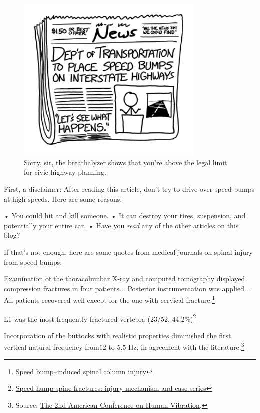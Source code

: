 {\begin{figure}[!htbp]
\centering
\includegraphics[scale=0.5, max width=0.8\textwidth]{imgs/a/61/speedbump_dot.png}
\caption{Sorry, sir, the breathalyzer shows that you're above the legal limit for civic highway planning.}
\end{figure}

{First, a disclaimer: After reading this article, don't try to drive over speed bumps at high speeds. Here are some reasons:}

{• You could hit and kill someone.
• It can destroy your tires, suspension, and potentially your entire car.
• Have you \emph{read} any of the other articles on this blog?
}

{If that's not enough, here are some quotes from medical journals on spinal injury from speed bumps:}

{Examination of the thoracolumbar X-ray and computed tomography displayed compression fractures in four patients... Posterior instrumentation was applied... All patients recovered well except for the one with cervical fracture.{\footnote{ \href{http://akademikpersonel.duzce.edu.tr/hayatikandis/sci/hayatikandis12.01.2012\_08.54.59sci.pdf}{Speed bump–induced spinal column injury}} } }

{L1 was the most frequently fractured vertebra (23/52, 44.2\%){\footnote{ \href{http://www.ncbi.nlm.nih.gov/pubmed/21150664}{Speed hump spine fractures: injury mechanism and case series}} } }

{Incorporation of the buttocks with realistic properties diminished the first vertical natural frequency from\~12 to 5.5 Hz, in agreement with the literature.{\footnote{Source: \href{http://www.cdc.gov/niosh/mining/UserFiles/works/pdfs/2009-145.pdf}{The 2nd American Conference on Human Vibration}.} } }

}
